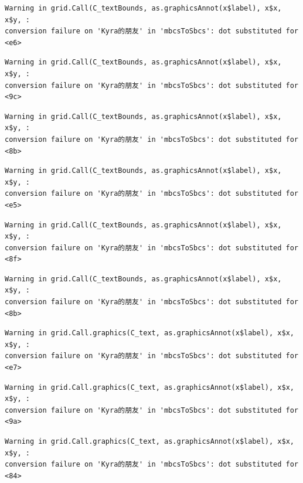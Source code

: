 \documentclass[
  letterpaper,
  DIV=11,
  numbers=noendperiod]{scrreprt}
\begin{document}
\begin{verbatim}
Warning in grid.Call(C_textBounds, as.graphicsAnnot(x$label), x$x, x$y, :
conversion failure on 'Kyra的朋友' in 'mbcsToSbcs': dot substituted for <e6>
\end{verbatim}

\begin{verbatim}
Warning in grid.Call(C_textBounds, as.graphicsAnnot(x$label), x$x, x$y, :
conversion failure on 'Kyra的朋友' in 'mbcsToSbcs': dot substituted for <9c>
\end{verbatim}

\begin{verbatim}
Warning in grid.Call(C_textBounds, as.graphicsAnnot(x$label), x$x, x$y, :
conversion failure on 'Kyra的朋友' in 'mbcsToSbcs': dot substituted for <8b>
\end{verbatim}

\begin{verbatim}
Warning in grid.Call(C_textBounds, as.graphicsAnnot(x$label), x$x, x$y, :
conversion failure on 'Kyra的朋友' in 'mbcsToSbcs': dot substituted for <e5>
\end{verbatim}

\begin{verbatim}
Warning in grid.Call(C_textBounds, as.graphicsAnnot(x$label), x$x, x$y, :
conversion failure on 'Kyra的朋友' in 'mbcsToSbcs': dot substituted for <8f>
\end{verbatim}

\begin{verbatim}
Warning in grid.Call(C_textBounds, as.graphicsAnnot(x$label), x$x, x$y, :
conversion failure on 'Kyra的朋友' in 'mbcsToSbcs': dot substituted for <8b>
\end{verbatim}

\begin{verbatim}
Warning in grid.Call.graphics(C_text, as.graphicsAnnot(x$label), x$x, x$y, :
conversion failure on 'Kyra的朋友' in 'mbcsToSbcs': dot substituted for <e7>
\end{verbatim}

\begin{verbatim}
Warning in grid.Call.graphics(C_text, as.graphicsAnnot(x$label), x$x, x$y, :
conversion failure on 'Kyra的朋友' in 'mbcsToSbcs': dot substituted for <9a>
\end{verbatim}

\begin{verbatim}
Warning in grid.Call.graphics(C_text, as.graphicsAnnot(x$label), x$x, x$y, :
conversion failure on 'Kyra的朋友' in 'mbcsToSbcs': dot substituted for <84>
\end{verbatim}
\end{document}
